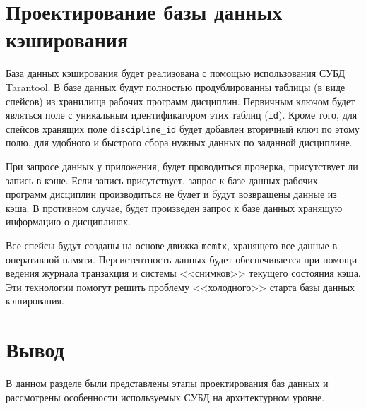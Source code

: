 \section{Проектирование базы данных кэширования}

База данных кэширования будет реализована с помощью использования СУБД Tarantool. В базе данных будут полностью продублированны таблицы (в виде спейсов) из хранилища рабочих программ дисциплин. Первичным ключом будет являться поле с уникальным идентификатором этих таблиц (\texttt{id}). Кроме того, для спейсов хранящих поле \texttt{discipline\_id} будет добавлен вторичный ключ по этому полю, для удобного и быстрого сбора нужных данных по заданной дисциплине.

При запросе данных у приложения, будет проводиться проверка, присутствует ли запись в кэше. Если запись присутствует, запрос к базе данных рабочих программ дисциплин производиться не будет и будут возвращены данные из кэша. В противном случае, будет произведен запрос к базе данных хранящую информацию о дисциплинах.

Все спейсы будут созданы на основе движка \texttt{memtx}, хранящего все данные в оперативной памяти. Персистентность данных будет обеспечивается при помощи ведения журнала транзакция и системы <<снимков>> текущего состояния кэша. Эти технологии помогут решить проблему <<холодного>> старта базы данных кэширования.

\section*{Вывод}

В данном разделе были представлены этапы проектирования баз данных и рассмотрены особенности используемых СУБД на архитектурном уровне.
